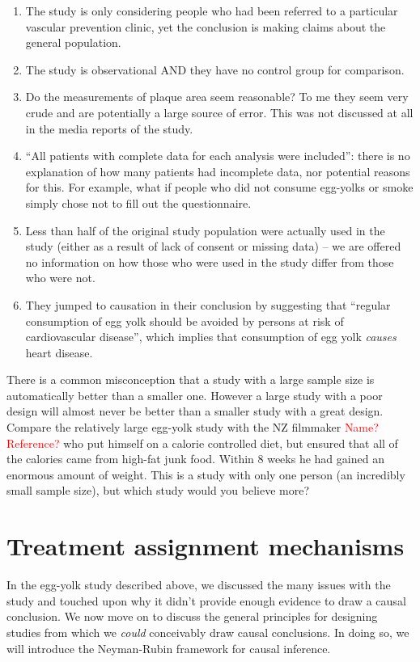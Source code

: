 \begin{enumerate}
\item The study is only considering people who had been referred to a particular vascular prevention clinic, yet the conclusion is making claims about the general population.
\item The study is observational AND they have no control group for comparison.
\item  Do the measurements of plaque area seem reasonable? To me they seem very crude and are potentially a large source of error. This was not discussed at all in the media reports of the study.
\item ``All patients with complete data for each analysis were included'': there is no explanation of how many patients had incomplete data, nor potential reasons for this. For example, what if people who did not consume egg-yolks or smoke simply chose not to fill out the questionnaire.
\item Less than half of the original study population were actually used in the study (either as a result of lack of consent or missing data) -- we are offered no information on how those who were used in the study differ from those who were not.
\item They jumped to causation in their conclusion by suggesting that ``regular consumption of egg yolk should be avoided by persons at risk of cardiovascular disease'', which implies that consumption of egg yolk \emph{causes} heart disease.
\end{enumerate}




There is a common misconception that a study with a large sample size is automatically better than a smaller one. However a large study with a poor design will almost never be better than a smaller study with a great design. Compare the relatively large egg-yolk study with the NZ filmmaker \textcolor{red}{Name? Reference?} who put himself on a calorie controlled diet, but ensured that all of the calories came from high-fat junk food. Within 8 weeks he had gained an enormous amount of weight. This is a study with only one person (an incredibly small sample size), but which study would you believe more? 


\section{Treatment assignment mechanisms}

In the egg-yolk study described above, we discussed the many issues with the study and touched upon why it didn't provide enough evidence to draw a causal conclusion. We now move on to discuss the general principles for designing studies from which we \textit{could} conceivably draw causal conclusions. In doing so, we will introduce the Neyman-Rubin framework for causal inference.




